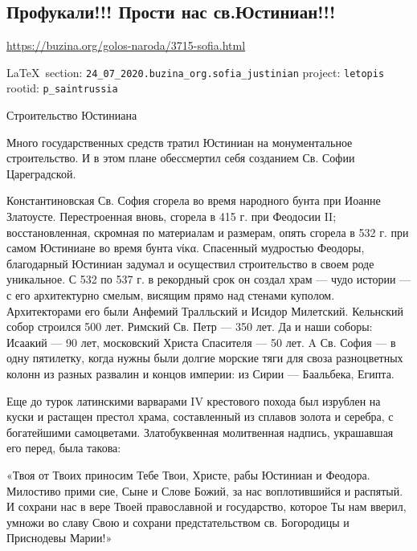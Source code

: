  
 
\subsection{Профукали!!! Прости нас св.Юстиниан!!!}
\url{https://buzina.org/golos-naroda/3715-sofia.html}
  
\vspace{0.5cm}
 {\ifDEBUG\small\LaTeX~section: \verb|24_07_2020.buzina_org.sofia_justinian| project: \verb|letopis| rootid: \verb|p_saintrussia| \fi}
\vspace{0.5cm}


Строительство Юстиниана

Много государственных средств тратил Юстиниан на монументальное строительство.
И в этом плане обессмертил себя созданием Св. Софии Цареградской.

Константиновская Св. София сгорела во время народного бунта при Иоанне
Златоусте. Перестроенная вновь, сгорела в 415 г. при Феодосии II;
восстановленная, скромная по материалам и размерам, опять сгорела в 532 г. при
самом Юстиниане во время бунта νίκα. Спасенный мудростью Феодоры, благодарный
Юстиниан задумал и осуществил строительство в своем роде уникальное. С 532 по
537 г. в рекордный срок он создал храм — чудо истории — с его архитектурно
смелым, висящим прямо над стенами куполом. Архитекторами его были Анфемий
Тралльский и Исидор Милетский. Кельнский собор строился 500 лет. Римский Св.
Петр — 350 лет. Да и наши соборы: Исаакий — 90 лет, московский Христа Спасителя
— 50 лет. A Св. София — в одну пятилетку, когда нужны были долгие морские тяги
для своза разноцветных колонн из разных развалин и концов империи: из Сирии —
Баальбека, Египта.

Еще до турок латинскими варварами IV крестового похода был изрублен на куски и
растащен престол храма, составленный из сплавов золота и серебра, с богатейшими
самоцветами. Златобуквенная молитвенная надпись, украшавшая его перед, была
такова:

«Твоя от Твоих приносим Тебе Твои, Христе, рабы Юстиниан и Феодора. Милостиво
прими сие, Сыне и Слове Божий, за нас воплотившийся и распятый. И сохрани нас в
вере Твоей православной и государство, которое Ты нам вверил, умножи во славу
Свою и сохрани предстательством св. Богородицы и Приснодевы Марии!»

